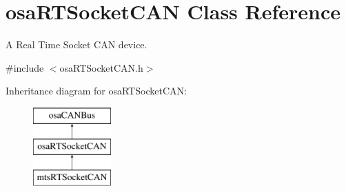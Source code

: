 \hypertarget{classosa_r_t_socket_c_a_n}{}\section{osa\+R\+T\+Socket\+C\+A\+N Class Reference}
\label{classosa_r_t_socket_c_a_n}


A Real Time Socket C\+A\+N device.  




{\ttfamily \#include $<$osa\+R\+T\+Socket\+C\+A\+N.\+h$>$}

Inheritance diagram for osa\+R\+T\+Socket\+C\+A\+N\+:\begin{figure}[H]
\begin{center}
\leavevmode
\includegraphics[height=3.000000cm]{d6/d60/classosa_r_t_socket_c_a_n}
\end{center}
\end{figure}
